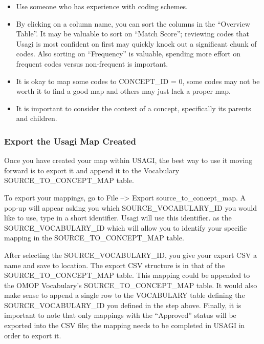 \documentclass[11pt]{book}
\providecommand{\tightlist}{%
  \setlength{\itemsep}{0pt}\setlength{\parskip}{0pt}}
\theoremstyle{definition}
\theoremstyle{definition}
\theoremstyle{definition}
\theoremstyle{remark}
\begin{document}
\begin{itemize}
\tightlist
\item
  Use someone who has experience with coding schemes.
\item
  By clicking on a column name, you can sort the columns in the ``Overview Table''. It may be valuable to sort on ``Match Score''; reviewing codes that Usagi is most confident on first may quickly knock out a significant chunk of codes. Also sorting on ``Frequency'' is valuable, spending more effort on frequent codes versus non-frequent is important.
\item
  It is okay to map some codes to CONCEPT\_ID = 0, some codes may not be worth it to find a good map and others may just lack a proper map.
\item
  It is important to consider the context of a concept, specifically its parents and children.
\end{itemize}

\hypertarget{export-the-usagi-map-created}{%
\subsubsection*{Export the Usagi Map Created}\label{export-the-usagi-map-created}}

Once you have created your map within USAGI, the best way to use it moving forward is to export it and append it to the Vocabulary SOURCE\_TO\_CONCEPT\_MAP table.

To export your mappings, go to File --\textgreater{} Export source\_to\_concept\_map. A pop-up will appear asking you which SOURCE\_VOCABULARY\_ID you would like to use, type in a short identifier. Usagi will use this identifier. as the SOURCE\_VOCABULARY\_ID which will allow you to identify your specific mapping in the SOURCE\_TO\_CONCEPT\_MAP table.

After selecting the SOURCE\_VOCABULARY\_ID, you give your export CSV a name and save to location. The export CSV structure is in that of the SOURCE\_TO\_CONCEPT\_MAP table. This mapping could be appended to the OMOP Vocabulary's SOURCE\_TO\_CONCEPT\_MAP table. It would also make sense to append a single row to the VOCABULARY table defining the SOURCE\_VOCABULARY\_ID you defined in the step above. Finally, it is important to note that only mappings with the ``Approved'' status will be exported into the CSV file; the mapping needs to be completed in USAGI in order to export it.
\end{document}

